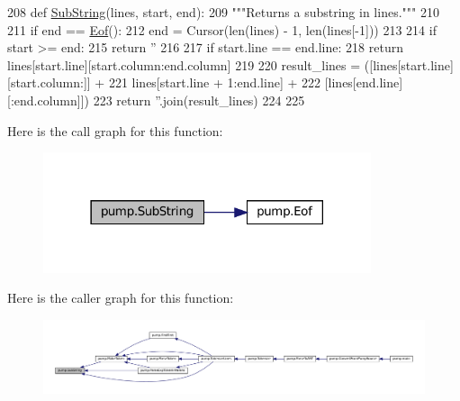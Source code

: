 \begin{DoxyCode}
208 \textcolor{keyword}{def }\hyperlink{namespacepump_a859edb180cfc24c24fabcfb4f2bedf9e}{SubString}(lines, start, end):
209   \textcolor{stringliteral}{"""Returns a substring in lines."""}
210 
211   \textcolor{keywordflow}{if} end == \hyperlink{namespacepump_a38844b22bd5a51c098b07c2c36c5c5b3}{Eof}():
212     end = Cursor(len(lines) - 1, len(lines[-1]))
213 
214   \textcolor{keywordflow}{if} start >= end:
215     \textcolor{keywordflow}{return} \textcolor{stringliteral}{''}
216 
217   \textcolor{keywordflow}{if} start.line == end.line:
218     \textcolor{keywordflow}{return} lines[start.line][start.column:end.column]
219 
220   result\_lines = ([lines[start.line][start.column:]] +
221                   lines[start.line + 1:end.line] +
222                   [lines[end.line][:end.column]])
223   \textcolor{keywordflow}{return} \textcolor{stringliteral}{''}.join(result\_lines)
224 
225 
\end{DoxyCode}
Here is the call graph for this function\+:
\nopagebreak
\begin{figure}[H]
\begin{center}
\leavevmode
\includegraphics[width=273pt]{namespacepump_a859edb180cfc24c24fabcfb4f2bedf9e_cgraph}
\end{center}
\end{figure}
Here is the caller graph for this function\+:
\nopagebreak
\begin{figure}[H]
\begin{center}
\leavevmode
\includegraphics[width=350pt]{namespacepump_a859edb180cfc24c24fabcfb4f2bedf9e_icgraph}
\end{center}
\end{figure}
\mbox{\label{namespacepump_aa42c23b1c914c0f86a94f2fa32999905}} 
